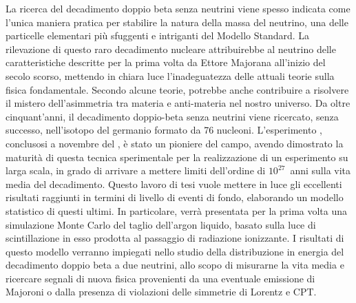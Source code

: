 
La ricerca del decadimento doppio beta senza neutrini viene spesso indicata come l'unica
maniera pratica per stabilire la natura della massa del neutrino, una delle particelle
elementari più sfuggenti e intriganti del Modello Standard. La rilevazione di questo raro
decadimento nucleare attribuirebbe al neutrino delle caratteristiche descritte per la
prima volta da Ettore Majorana all'inizio del secolo scorso, mettendo in chiara luce
l'inadeguatezza delle attuali teorie sulla fisica fondamentale. Secondo alcune teorie,
potrebbe anche contribuire a risolvere il mistero dell'asimmetria tra materia e
anti-materia nel nostro universo. Da oltre cinquant'anni, il decadimento doppio-beta senza
neutrini viene ricercato, senza successo, nell'isotopo del germanio formato da 76
nucleoni. L'esperimento \gerda, conclusosi a novembre del , è stato un pioniere
del campo, avendo dimostrato la maturità di questa tecnica sperimentale per la
realizzazione di un esperimento su larga scala, in grado di arrivare a mettere limiti
dell'ordine di $10^{27}$~anni sulla vita media del decadimento. Questo lavoro di tesi
vuole mettere in luce gli eccellenti risultati raggiunti in termini di livello di eventi di
fondo, elaborando un modello statistico di questi ultimi. In particolare, verrà presentata
per la prima volta una simulazione Monte Carlo del taglio dell'argon liquido, basato sulla
luce di scintillazione in esso prodotta al passaggio di radiazione ionizzante. I risultati
di questo modello verranno impiegati nello studio della distribuzione in energia del
decadimento doppio beta a due neutrini, allo scopo di misurarne la vita media e ricercare
segnali di nuova fisica provenienti da una eventuale emissione di Majoroni o dalla presenza
di violazioni delle simmetrie di Lorentz e CPT. 

